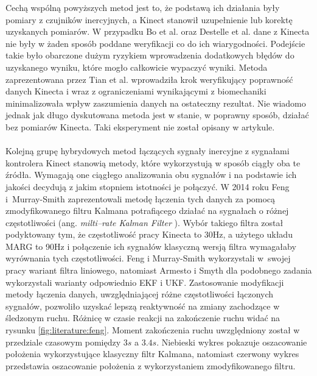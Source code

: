 Cechą wspólną powyższych metod jest to, że podstawą ich działania były pomiary z czujników inercyjnych, a Kinect stanowił uzupełnienie lub korektę uzyskanych pomiarów. W przypadku Bo et al. oraz Destelle et al. dane z Kinecta nie były w żaden sposób poddane weryfikacji co do ich wiarygodności. Podejście takie było obarczone dużym ryzykiem wprowadzenia dodatkowych błędów do uzyskanego wyniku, które mogło całkowicie wypaczyć wyniki. Metoda zaprezentowana przez Tian et al. wprowadziła krok weryfikujący poprawność danych Kinecta i wraz z ograniczeniami wynikającymi z biomechaniki minimalizowała wpływ zaszumienia danych na ostateczny rezultat. Nie wiadomo jednak jak długo dyskutowana metoda jest w stanie, w poprawny sposób, działać bez pomiarów Kinecta. Taki eksperyment nie został opisany w artykule.\\\\

Kolejną grupę hybrydowych metod łączących sygnały inercyjne z sygnałami kontrolera Kinect stanowią metody, które wykorzystują w sposób ciągły oba te źródła. Wymagają one ciągłego analizowania obu sygnałów i na podstawie ich jakości decydują z jakim stopniem istotności je połączyć. W 2014 roku Feng i~Murray-Smith \cite{Murray-Smith2014} zaprezentowali metodę łączenia tych danych za pomocą zmodyfikowanego filtru Kalmana potrafiącego działać na sygnałach o różnej częstotliwości (ang. \emph{milti--rate Kalman Filter} \cite{Dhuli2009}). Wybór takiego filtra został podyktowany tym, że częstotliwość pracy Kinecta to 30Hz, a użytego układu MARG to 90Hz i połączenie ich sygnałów klasyczną wersją filtra wymagałaby wyrównania tych częstotliwości. Feng i Murray-Smith wykorzystali w~swojej pracy wariant filtra liniowego, natomiast Armesto i Smyth dla podobnego zadania wykorzystali warianty odpowiednio EKF\cite{Armesto01062007} i UKF\cite{Smyth2007}. Zastosowanie modyfikacji metody łączenia danych, uwzględniającej różne częstotliwości łączonych sygnałów, pozwoliło uzyskać lepszą reaktywność na zmiany zachodzące w śledzonym ruchu. Różnicę w czasie reakcji na zakończenie ruchu widać na rysunku \ref{fig:literature:feng}. Moment zakończenia ruchu uwzględniony został w przedziale czasowym pomiędzy $3s$ a $3.4s$. Niebieski wykres pokazuje oszacowanie położenia wykorzystujące klasyczny filtr Kalmana, natomiast czerwony wykres przedstawia oszacowanie położenia z wykorzystaniem zmodyfikowanego filtru.

